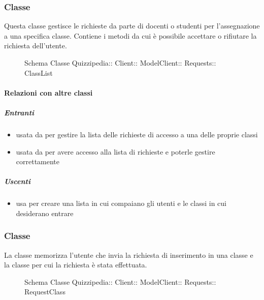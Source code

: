 \subsubsection{Classe }
Questa classe gestisce le richieste da parte di docenti o studenti per l'assegnazione a una specifica classe. Contiene i metodi da cui è possibile accettare o rifiutare la richiesta dell'utente.
\begin{figure}[H]
\centering
\noindent{}
\caption[Schema Classe ClassList]{Schema Classe Quizzipedia:: Client:: ModelClient:: Requests:: ClassList}
\end{figure}
\paragraph{Relazioni con altre classi}
\subparagraph{Entranti}
\begin{itemize}
\item usata da  per gestire la lista delle richieste di accesso a una delle proprie classi
\item usata da  per avere accesso alla lista di richieste e poterle gestire correttamente
\end{itemize}
\subparagraph{Uscenti}
\begin{itemize}
\item usa  per creare una lista in cui compaiano gli utenti e le classi in cui desiderano entrare
\end{itemize}
\subsubsection{Classe }
La classe memorizza l'utente che invia la richiesta di inserimento in una classe e la classe per cui la richiesta è stata effettuata.
\begin{figure}[H]
\centering
\noindent{}
\caption[Schema Classe RequestClass]{Schema Classe Quizzipedia:: Client:: ModelClient:: Requests:: RequestClass}
\end{figure}
